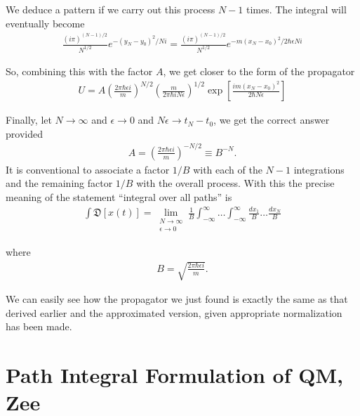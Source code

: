 \documentclass{book}
\theoremstyle{definition}
\newcommand{\f}[2]{\frac{#1}{#2}}
\newcommand{\lp}{\left(}
\newcommand{\rp}{\right)}
\newcommand{\lb}{\left[}
\newcommand{\rb}{\right]}
\begin{document}
We deduce a pattern if we carry out this process $N-1$ times. The integral will eventually become
\begin{align}
\boxed{\f{(i\pi)^{(N-1)/2}}{N^{1/2}} e^{-(y_N - y_0)^2 / Ni} = \f{(i\pi)^{(N-1)/2}}{N^{1/2}} e^{-m(x_N - x_0)^2 / 2\hbar\epsilon Ni}}
\end{align}

So, combining this with the factor $A$, we get closer to the form of the propagator
\begin{align}
\boxed{U = A\lp \f{2\pi\hbar \epsilon i}{m} \rp^{N/2} \lp \f{m}{2\pi\hbar i N \epsilon} \rp^{1/2}  \exp \lb \f{im(x_N - x_0)^2}{2\hbar N \epsilon} \rb} 
\end{align}

Finally, let $N\to \infty$ and $\epsilon \to 0$ and $N\epsilon \to t_N - t_0$, we get the correct answer provided 
\begin{align}
A = \lp \f{2\pi\hbar \epsilon i}{m} \rp^{-N/2} \equiv B^{-N}.
\end{align}
It is conventional to associate a factor $1/B$ with each of the $N-1$ integrations and the remaining factor $1/B$ with the overall process. With this the precise meaning of the statement ``integral over all paths'' is 
\begin{align}
\boxed{\int \mathfrak{D}[x(t)] = \lim_{\substack{N\to\infty \\ \epsilon\to 0}} \f{1}{B} \int_{-\infty}^{\infty} \dots \int_{-\infty}^{\infty}  \f{dx_1}{B}\dots \f{dx_N}{B}}
\end{align}


where
\begin{align}
B = \sqrt{\f{2\pi\hbar \epsilon i}{m}}.
\end{align}


We can easily see how the propagator we just found is exactly the same as that derived earlier and the approximated version, given appropriate normalization has been made. 








\newpage







\section{Path Integral Formulation of QM, Zee}
\end{document}
